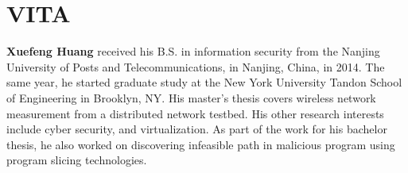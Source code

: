 \chapter*{VITA}
\textbf{Xuefeng Huang} received his B.S. in information security from the Nanjing University of Posts and Telecommunications, in Nanjing, China, in 2014. The same year, he started graduate study at the New York University Tandon School of Engineering in Brooklyn, NY. His master’s thesis covers wireless network measurement from a distributed network testbed. His other research interests include cyber security, and virtualization. As part of the work for his bachelor thesis, he also worked on discovering infeasible path in malicious program using program slicing technologies.